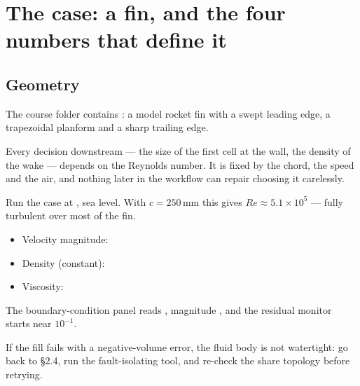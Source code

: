 \documentclass[10pt,a4paper]{article}
\begin{document}
\clearpage
\tableofcontents
\clearpage

\section{The case: a fin, and the four numbers that define it}

\subsection{Geometry}

The course folder contains : a model rocket fin with a swept
leading edge, a trapezoidal planform and a sharp trailing edge.

\begin{why}
Every decision downstream --- the size of the first cell at the wall, the
density of the wake --- depends on the Reynolds number. It is fixed by the
chord, the speed and the air, and nothing later in the workflow can repair
choosing it carelessly.
\end{why}


Run the case at , sea level. With $c = 250$\,mm this gives
$Re \approx 5.1\times10^{5}$ --- fully turbulent over most of the fin.

\begin{vals}
\begin{itemize}
  \item Velocity magnitude: 
  \item Density (constant): 
  \item Viscosity: 
\end{itemize}
\end{vals}

\begin{chk}
The boundary-condition panel reads , magnitude
, and the residual monitor starts near $10^{-1}$.
\end{chk}

\begin{fail}
If the fill fails with a negative-volume error, the fluid body is not
watertight: go back to \S2.4, run the fault-isolating tool, and re-check
the share topology before retrying.
\end{fail}
\end{document}
